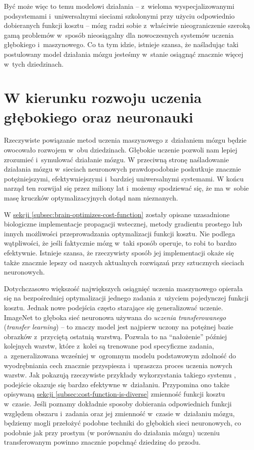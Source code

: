Być może więc to temu modelowi działania -- z~wieloma wyspecjalizowanymi podsystemami i~uniwersalnymi sieciami szkolonymi przy użyciu odpowiednio dobieranych funkcji kosztu -- mózg radzi sobie z~właściwie nieograniczenie szeroką gamą problemów w~sposób nieosiągalny dla nowoczesnych systemów uczenia głębokiego i~maszynowego.
Co ta tym idzie, istnieje szansa, że naśladując taki postulowany model działania mózgu jesteśmy w~stanie osiągnąć znacznie więcej w~tych dziedzinach.

\section{W kierunku rozwoju uczenia głębokiego oraz neuronauki}

Rzeczywiste powiązanie metod uczenia maszynowego z~działaniem mózgu będzie owocowało rozwojem w~obu dziedzinach.
Głębokie uczenie pozwoli nam lepiej zrozumieć i~symulować działanie mózgu.
W przeciwną stronę naśladowanie działania mózgu w~sieciach neuronowych prawdopodobnie poskutkuje znacznie potężniejszymi, efektywniejszymi i~bardziej uniwersalnymi systemami.
W końcu narząd ten rozwijał się przez miliony lat i~możemy spodziewać się, że ma w~sobie masę kruczków optymalizacyjnych dotąd nam nieznanych.

W \hyperref[subsec:brain-optimizes-cost-function]{sekcji \ref*{subsec:brain-optimizes-cost-function}} zostały opisane uzasadnione biologiczne implementacje propagacji wstecznej, metody gradientu prostego lub innych możliwości przeprowadzania optymalizacji funkcji kosztu.
Nie podlega wątpliwości, że jeśli faktycznie mózg w~taki sposób operuje, to robi to bardzo efektywnie.
Istnieje szansa, że rzeczywisty sposób jej implementacji okaże się także znacznie lepszy od naszych aktualnych rozwiązań przy sztucznych sieciach neuronowych.

Dotychczasowo większość największych osiągnięć uczenia maszynowego opierała się na bezpośredniej optymalizacji jednego zadania z~użyciem pojedynczej funkcji kosztu.
Jednak nowe podejścia często starające się generalizować uczenie.
ImageNet to głęboka sieć neuronowa używana do \emph{uczenia transferowanego} (\emph{transfer learning}) -- to znaczy model jest najpierw uczony na potężnej bazie obrazków z~przyciętą ostatnią warstwą.
Pozwala to na ``nałożenie'' później kolejnych warstw, które z~kolei są trenowane pod specyficzne zadania, a~zgeneralizowana wcześniej w~ogromnym modelu podstawowym zdolność do wyodrębniania cech znacznie przyspiesza i~upraszcza proces uczenia nowych warstw.
Jak pokazują rzeczywiste przykłady wykorzystania takiego systemu \cite{marmanis2015deep}, podejście okazuje się bardzo efektywne w~działaniu.
Przypomina ono także opisywaną \hyperref[subsec:cost-function-is-diverse]{sekcji \ref*{subsec:cost-function-is-diverse}} zmienność funkcji kosztu w~czasie.
Jeśli poznamy dokładnie sposoby dobierania odpowiednich funkcji względem obszaru i~zadania oraz jej zmienność w~czasie w~działaniu mózgu, będziemy mogli przełożyć podobne techniki do głębokich sieci neuronowych, co podobnie jak przy prostym (w porównaniu do działania mózgu) uczeniu transferowanym powinno znacznie popchnąć dziedzinę do przodu.

